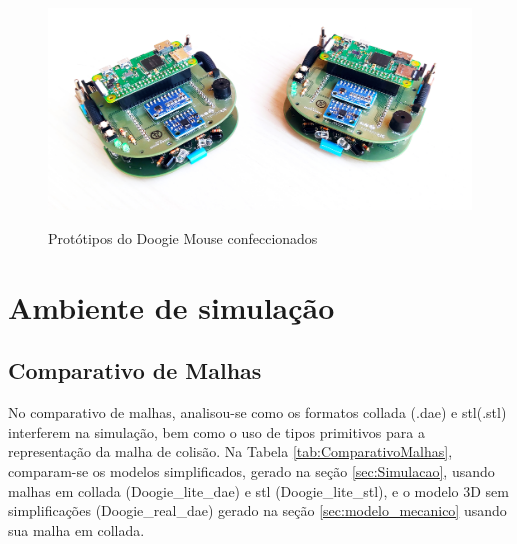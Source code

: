 \begin{figure}[H]
	\centering
	\caption{Protótipos do Doogie Mouse confeccionados}
	\includegraphics[width=1\textwidth]
	{Figures/doogie_mouse_prototipos}
	\label{fig:prototipos}
\end{figure}

\section{Ambiente de simulação}
\label{sec:resultado_ambiente_de_simulacao}
\subsection{Comparativo de Malhas}
\label{ssec:comparativo_de_malhas}
No comparativo de malhas, analisou-se como os formatos \gls{collada} (.dae) e \gls{stl}(.stl) interferem na simulação, bem como o uso de tipos primitivos para a representação da malha de colisão. Na Tabela \ref{tab:ComparativoMalhas}, comparam-se os modelos simplificados, gerado na seção \ref{sec:Simulacao}, usando malhas em \gls*{collada} (Doogie\_lite\_dae) e \gls*{stl} (Doogie\_lite\_stl), e o modelo 3D sem simplificações (Doogie\_real\_dae) gerado na seção \ref{sec:modelo_mecanico} usando sua malha em \gls*{collada}.

